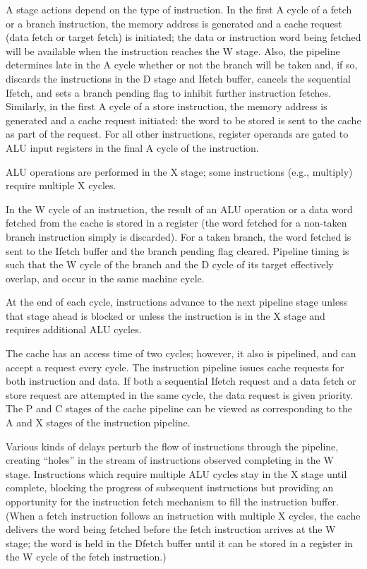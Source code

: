 A stage actions depend on the type of instruction. In the first A cycle of a
fetch or a branch instruction, the memory address is generated and a cache
request (data fetch or target fetch) is initiated; the data or instruction word
being fetched will be available when the instruction reaches the W stage.
Also, the pipeline determines late in the A cycle whether or not the branch
\noindent will be taken and, if so, discards the instructions in the D stage and Ifetch
buffer, cancels the sequential Ifetch, and sets a branch pending flag to inhibit
further instruction fetches. Similarly, in the first A cycle of a store instruction,
the memory address is generated and a cache request initiated: the
word to be stored is sent to the cache as part of the request. For all other
instructions, register operands are gated to ALU input registers in the final A
cycle of the instruction.

ALU operations are performed in the X stage; some instructions (e.g.,
multiply) require multiple X cycles.

In the W cycle of an instruction, the result of an ALU operation or a data
word fetched from the cache is stored in a register (the word fetched for a
non-taken branch instruction simply is discarded). For a taken branch, the
word fetched is sent to the Ifetch buffer and the branch pending flag cleared.
Pipeline timing is such that the W cycle of the branch and the D cycle of its
target effectively overlap, and occur in the same machine cycle.

At the end of each cycle, instructions advance to the next pipeline stage
unless that stage ahead is blocked or unless the instruction is in the X stage
and requires additional ALU cycles.

The cache has an access time of two cycles; however, it also is pipelined,
and can accept a request every cycle. The instruction pipeline issues cache
requests for both instruction and data. If both a sequential Ifetch request and
a data fetch or store request are attempted in the same cycle, the data
request is given priority. The P and C stages of the cache pipeline can be
viewed as corresponding to the A and X stages of the instruction pipeline.

Various kinds of delays perturb the flow of instructions through the
pipeline, creating ``holes'' in the stream of instructions observed completing
in the W stage. Instructions which require multiple ALU cycles stay in the X
stage until complete, blocking the progress of subsequent instructions but
providing an opportunity for the instruction fetch mechanism to fill the
instruction buffer. (When a fetch instruction follows an instruction with
multiple X cycles, the cache delivers the word being fetched before the fetch
instruction arrives at the W stage; the word is held in the Dfetch buffer
until it can be stored in a register in the W cycle of the fetch instruction.)

